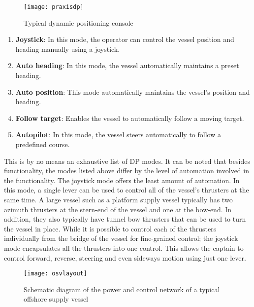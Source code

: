 \begin{figure}
	\centering
	\texttt{[image: praxisdp]}
	\caption{Typical dynamic positioning console}
	\label{fig:praxisdp}
\end{figure}

\begin{enumerate}

\item \textbf{Joystick}: In this mode, the operator can control the vessel position and heading manually using a joystick. 
\item \textbf{Auto heading}: In this mode, the vessel automatically maintains a preset heading. 
\item \textbf{Auto position}: This mode automatically maintains the vessel's position and heading. 
\item \textbf{Follow target}: Enables the vessel to automatically follow a moving target. 
\item \textbf{Autopilot}: In this mode, the vessel steers automatically to follow a predefined course. 

\end{enumerate}

This is by no means an exhaustive list of DP modes. It can be noted that besides functionality, the modes listed above differ by the level of automation involved in the functionality.  The joystick mode offers the least amount of automation. In this mode, a single lever can be used to control all of the vessel's thrusters at the same time. A large vessel such as a platform supply vessel typically has two azimuth thrusters at the stern-end of the vessel and one at the bow-end. In addition, they also typically have tunnel bow thrusters that can be used to turn the vessel in place. While it is possible to control each of the thrusters individually from the bridge of the vessel for fine-grained control; the joystick mode encapsulates all the thrusters into one control. This allows the captain to control forward, reverse, steering and even sideways motion using just one lever.


\begin{figure}
	\centering
	\texttt{[image: osvlayout]}
	\caption{Schematic diagram of the power and control network of a typical offshore supply vessel}
	\label{fig:osvlayout}
\end{figure}


